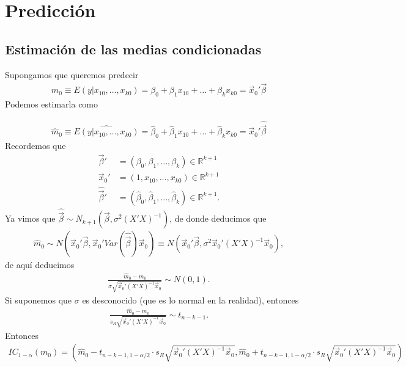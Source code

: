\section{Predicción}

\subsection{Estimación de las medias condicionadas}
\noindent Supongamos que queremos predecir 
\begin{align*}
    m_0 \equiv E(y | x_{10},\ldots,x_{k0}) = \beta_0 + \beta_1 x_{10} + \ldots + \beta_kx_{k0} = \vec{x}_0' \vec{\beta}
\end{align*}
Podemos estimarla como

\begin{align*}
    \widehat{m}_0 \equiv \widehat{E(y | x_{10},\ldots,x_{k0})} = \widehat{\beta}_0 + \widehat{\beta}_1 x_{10} + \ldots + \widehat{\beta}_kx_{k0} = \vec{x}_0' \widehat{\vec{\beta}}
\end{align*}
Recordemos que
\begin{align*}
    \vec{\beta}' &= (\beta_0,\beta_1,\ldots,\beta_k) \in \mathbb{R}^{k+1} \\
    \vec{x}_0' &= (1,x_{10},\ldots,x_{k0}) \in \mathbb{R}^{k+1} \\
    \widehat{\vec{\beta}}' &= (\widehat{\beta}_0, \widehat{\beta}_1, \ldots, \widehat{\beta}_k) \in \mathbb{R}^{k+1}.
\end{align*}
Ya vimos que $\widehat{\vec{\beta}} \sim N_{k+1}\left( \vec{\beta}, \sigma^2(X'X)^{-1} \right)$, de donde deducimos que
\begin{align*}
    \widehat{m}_0 \sim N\left( \vec{x}_0'\vec{\beta}, \vec{x}_0'Var\left(\widehat{\vec{\beta}}\right)\vec{x}_0 \right) \equiv N\left( \vec{x}_0'\vec{\beta}, \sigma^2\vec{x}_0'(X'X)^{-1}\vec{x}_0 \right),
\end{align*}
de aquí deducimos 
\begin{align*}
    \frac{\widehat{m}_0 - m_0}{\sigma \sqrt{\vec{x}_0'(X'X)^{-1}\vec{x}_0}} \sim N(0,1).
\end{align*}
Si suponemos que $\sigma$ es desconocido (que es lo normal en la realidad), entonces
\begin{align*}
    \frac{\widehat{m}_0 - m_0}{s_R \sqrt{\vec{x}_0'(X'X)^{-1}\vec{x}_0}} \sim t_{n-k-1}.
\end{align*}
Entonces
\begin{align*}
    IC_{1-\alpha}(m_0) = \left( \widehat{m}_0 - t_{n-k-1,1-\alpha/2} \cdot s_R \sqrt{\vec{x}_0'(X'X)^{-1}\vec{x}_0}, \widehat{m}_0 + t_{n-k-1,1-\alpha/2} \cdot s_R \sqrt{\vec{x}_0'(X'X)^{-1}\vec{x}_0} \right)
\end{align*}

